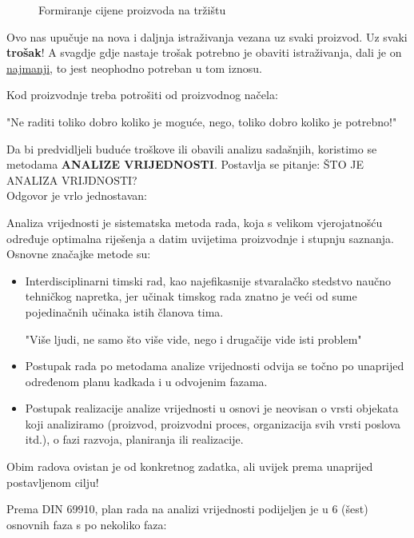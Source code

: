 \documentclass[a4paper,12pt]{article}
\numberwithin{figure}{section}
\begin{document}
\begin{figure}
\centering
 
\caption{Formiranje cijene proizvoda na tržištu}\label{Slika1}
\end{figure}
\FloatBarrier
\par
Ovo nas upučuje na nova i daljnja istraživanja vezana uz svaki proizvod. Uz svaki \textbf{trošak}! A svagdje gdje nastaje trošak potrebno je obaviti istraživanja, dali je on \underline{najmanji}, to jest neophodno potreban u tom iznosu.\par
Kod proizvodnje treba potrošiti od proizvodnog načela:
\begin{center}
"Ne raditi toliko dobro koliko je moguće, nego, toliko dobro koliko je potrebno!"
\end{center}
\par
Da bi predvidljeli buduće troškove ili obavili analizu sadašnjih, koristimo se metodama \textbf{ANALIZE VRIJEDNOSTI}. Postavlja se pitanje: ŠTO JE ANALIZA VRIJDNOSTI?\\
Odgovor je vrlo jednostavan:\par
Analiza vrijednosti je sistematska metoda rada, koja s velikom vjerojatnošću određuje optimalna riješenja a datim uvijetima proizvodnje i stupnju saznanja. \\
Osnovne značajke metode su:
\begin{itemize}
\item Interdisciplinarni timski rad, kao najefikasnije stvaralačko stedstvo naučno tehničkog napretka, jer učinak timskog rada znatno je veći od sume pojedinačnih učinaka istih članova tima.
\begin{center}
"Više ljudi, ne samo što više vide, nego i drugačije vide isti problem"
\end{center}
\item Postupak rada po metodama analize vrijednosti odvija se točno po unaprijed  određenom planu kadkada i u odvojenim fazama.
\item Postupak realizacije analize vrijednosti u osnovi je neovisan o vrsti objekata koji analiziramo (proizvod, proizvodni proces, organizacija svih vrsti poslova itd.), o fazi razvoja, planiranja ili realizacije.
\end{itemize}
\par
Obim radova ovistan je od konkretnog zadatka, ali uvijek prema unaprijed postavljenom cilju!
\par
Prema DIN 69910, plan rada na analizi vrijednosti podijeljen je u 6 (šest) osnovnih faza s po nekoliko faza:
\end{document}
